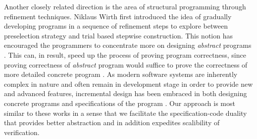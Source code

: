 \documentclass[11pt]{article}
\begin{document}
Another closely related direction is the area of structural programming through refinement techniques. Niklaus Wirth \cite{Wirth:1971} first introduced the idea of gradually developing programs in a sequence of refinement steps to explore between preselection strategy and trial based stepwise construction. This notion has encouraged the programmers to concentrate more on designing \emph{abstract} programs \cite{Lekkos:1978, Morris:1973, Chand:1978}. This can, in result, speed up the process of proving program correctness, since proving correctness of \emph{abstract} program would suffice to prove the correctness of more detailed concrete program \cite{Hoare:1972, Milner:1971}. As modern software systems are inherently complex in nature and often remain in development stage in order to provide new and advanced features, incremental design has been embraced in both designing concrete programs \cite{Morrison:2011} and specifications of the program \cite{Nishida:1972}. Our approach is most similar to these works in a sense that we facilitate the specification-code duality that provides better abstraction and in addition expedites scalibility of verification. 
\end{document}
